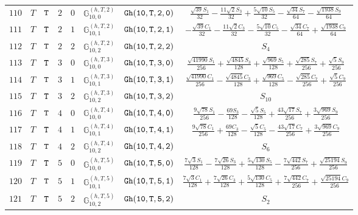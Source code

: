 \documentclass[fleqn,8pt]{jsarticle}
\begin{document}
\begin{table}[ht!]
\begin{center}
\begin{tabular}{cccccccc}
$ 110 $ & $ T $ & $ {\tt T} $ & $ 2 $ & $ 0 $ & $ \mathbb{G}_{10,0}^{(h,T,2)} $ & $ {\tt Gh(10,T,2,0)} $ & $ \frac{\sqrt{39} S_{1}}{32} - \frac{11 \sqrt{2} S_{3}}{32} + \frac{5 \sqrt{10} S_{5}}{32} - \frac{\sqrt{34} S_{7}}{64} - \frac{\sqrt{1938} S_{9}}{64} $ \\
$ 111 $ & $ T $ & $ {\tt T} $ & $ 2 $ & $ 1 $ & $ \mathbb{G}_{10,1}^{(h,T,2)} $ & $ {\tt Gh(10,T,2,1)} $ & $ - \frac{\sqrt{39} C_{1}}{32} - \frac{11 \sqrt{2} C_{3}}{32} - \frac{5 \sqrt{10} C_{5}}{32} - \frac{\sqrt{34} C_{7}}{64} + \frac{\sqrt{1938} C_{9}}{64} $ \\
$ 112 $ & $ T $ & $ {\tt T} $ & $ 2 $ & $ 2 $ & $ \mathbb{G}_{10,2}^{(h,T,2)} $ & $ {\tt Gh(10,T,2,2)} $ & $ S_{4} $ \\
$ 113 $ & $ T $ & $ {\tt T} $ & $ 3 $ & $ 0 $ & $ \mathbb{G}_{10,0}^{(h,T,3)} $ & $ {\tt Gh(10,T,3,0)} $ & $ \frac{\sqrt{41990} S_{1}}{256} + \frac{\sqrt{4845} S_{3}}{128} + \frac{\sqrt{969} S_{5}}{128} + \frac{\sqrt{285} S_{7}}{256} + \frac{\sqrt{5} S_{9}}{256} $ \\
$ 114 $ & $ T $ & $ {\tt T} $ & $ 3 $ & $ 1 $ & $ \mathbb{G}_{10,1}^{(h,T,3)} $ & $ {\tt Gh(10,T,3,1)} $ & $ \frac{\sqrt{41990} C_{1}}{256} - \frac{\sqrt{4845} C_{3}}{128} + \frac{\sqrt{969} C_{5}}{128} - \frac{\sqrt{285} C_{7}}{256} + \frac{\sqrt{5} C_{9}}{256} $ \\
$ 115 $ & $ T $ & $ {\tt T} $ & $ 3 $ & $ 2 $ & $ \mathbb{G}_{10,2}^{(h,T,3)} $ & $ {\tt Gh(10,T,3,2)} $ & $ S_{10} $ \\
$ 116 $ & $ T $ & $ {\tt T} $ & $ 4 $ & $ 0 $ & $ \mathbb{G}_{10,0}^{(h,T,4)} $ & $ {\tt Gh(10,T,4,0)} $ & $ \frac{9 \sqrt{78} S_{1}}{256} - \frac{69 S_{3}}{128} - \frac{\sqrt{5} S_{5}}{128} + \frac{43 \sqrt{17} S_{7}}{256} + \frac{3 \sqrt{969} S_{9}}{256} $ \\
$ 117 $ & $ T $ & $ {\tt T} $ & $ 4 $ & $ 1 $ & $ \mathbb{G}_{10,1}^{(h,T,4)} $ & $ {\tt Gh(10,T,4,1)} $ & $ \frac{9 \sqrt{78} C_{1}}{256} + \frac{69 C_{3}}{128} - \frac{\sqrt{5} C_{5}}{128} - \frac{43 \sqrt{17} C_{7}}{256} + \frac{3 \sqrt{969} C_{9}}{256} $ \\
$ 118 $ & $ T $ & $ {\tt T} $ & $ 4 $ & $ 2 $ & $ \mathbb{G}_{10,2}^{(h,T,4)} $ & $ {\tt Gh(10,T,4,2)} $ & $ S_{6} $ \\
$ 119 $ & $ T $ & $ {\tt T} $ & $ 5 $ & $ 0 $ & $ \mathbb{G}_{10,0}^{(h,T,5)} $ & $ {\tt Gh(10,T,5,0)} $ & $ \frac{7 \sqrt{3} S_{1}}{128} - \frac{7 \sqrt{26} S_{3}}{128} + \frac{5 \sqrt{130} S_{5}}{128} - \frac{7 \sqrt{442} S_{7}}{256} + \frac{\sqrt{25194} S_{9}}{256} $ \\
$ 120 $ & $ T $ & $ {\tt T} $ & $ 5 $ & $ 1 $ & $ \mathbb{G}_{10,1}^{(h,T,5)} $ & $ {\tt Gh(10,T,5,1)} $ & $ \frac{7 \sqrt{3} C_{1}}{128} + \frac{7 \sqrt{26} C_{3}}{128} + \frac{5 \sqrt{130} C_{5}}{128} + \frac{7 \sqrt{442} C_{7}}{256} + \frac{\sqrt{25194} C_{9}}{256} $ \\
$ 121 $ & $ T $ & $ {\tt T} $ & $ 5 $ & $ 2 $ & $ \mathbb{G}_{10,2}^{(h,T,5)} $ & $ {\tt Gh(10,T,5,2)} $ & $ S_{2} $ \\
 \hline \hline
\end{tabular}
\end{center}
\end{table}
\end{document}
